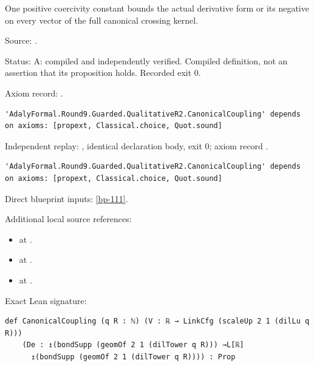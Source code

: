 \begin{definition}[bp-112]
\label{bp-112}
\leanok
One positive coercivity constant bounds the actual derivative form or its negative on every vector of the full canonical crossing kernel.

\par Source: \texttt{}.
\par Status: A: compiled and independently verified. Compiled definition, not an assertion that its proposition holds. Recorded exit 0.
\par Axiom record: \texttt{}.
\begin{verbatim}
'AdalyFormal.Round9.Guarded.QualitativeR2.CanonicalCoupling' depends on axioms: [propext, Classical.choice, Quot.sound]
\end{verbatim}
\par Independent replay: \texttt{}, identical declaration body, exit 0; axiom record \texttt{}.
\begin{verbatim}
'AdalyFormal.Round9.Guarded.QualitativeR2.CanonicalCoupling' depends on axioms: [propext, Classical.choice, Quot.sound]
\end{verbatim}
\par Direct blueprint inputs: \ref{bp-111}.
\par Additional local source references:
\begin{itemize}
\item \texttt{} at \texttt{}.
\item \texttt{} at \texttt{}.
\item \texttt{} at \texttt{}.
\end{itemize}
\par Exact Lean signature:
\begin{verbatim}
def CanonicalCoupling (q R : ℕ) (V : ℝ → LinkCfg (scaleUp 2 1 (dilLu q R)))
    (De : ↥(bondSupp (geomOf 2 1 (dilTower q R))) →L[ℝ]
      ↥(bondSupp (geomOf 2 1 (dilTower q R)))) : Prop
\end{verbatim}
\end{definition}

